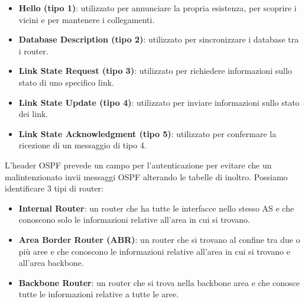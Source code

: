 \documentclass[12pt]{report}
\begin{document}
\begin{itemize}
	\item \textbf{Hello (tipo 1)}: utilizzato per annunciare la propria esistenza, per scoprire i vicini e per mantenere i collegamenti.
	\item \textbf{Database Description (tipo 2)}: utilizzato per sincronizzare i database tra i router.
	\item \textbf{Link State Request (tipo 3)}: utilizzato per richiedere informazioni sullo stato di uno specifico link.
	\item \textbf{Link State Update (tipo 4)}: utilizzato per inviare informazioni sullo stato dei link.
	\item \textbf{Link State Acknowledgment (tipo 5)}: utilizzato per confermare la ricezione di un messaggio di tipo 4.
\end{itemize}
L'header OSPF prevede un campo per l'autenticazione per evitare che un malintenzionato invii messaggi OSPF alterando le tabelle di inoltro.
Possiamo identificare 3 tipi di router:
\begin{itemize}
	\item \textbf{Internal Router}: un router che ha tutte le interfacce nello stesso AS e che conoscono solo le informazioni relative all'area in cui si trovano.
	\item \textbf{Area Border Router (ABR)}: un router che si trovano al confine tra due o più aree e che conoscono le informazioni relative all'area in cui si trovano e all'area backbone.
	\item \textbf{Backbone Router}: un router che si trova nella backbone area e che conosce tutte le informazioni relative a tutte le aree.
\end{itemize}
\end{document}
